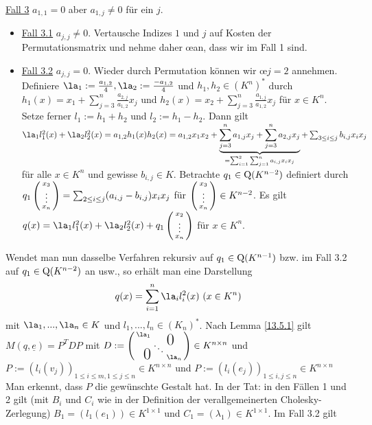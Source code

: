 \documentclass[../../main.tex]{subfiles}
\begin{document}
\begin{cproof}
\noindent\underline{Fall 3} $a_{1,1}=0$ aber $a_{1,j}\neq 0$ für ein $j$. 
\begin{itemize}
\item[ ]\underline{Fall 3.1} $a_{j,j}\neq 0$. Vertausche Indizes $1$ und $j$ auf Kosten der Permutationsmatrix und nehme daher \oe an, dass wir im Fall 1 sind.
\item[ ] \underline{Fall 3.2} $a_{j,j}=0$. Wieder durch Permutation können wir \oe $j=2$ annehmen. Definiere $\la_1:=\frac{a_{1,2}}{4}, \la_2:=\frac{-a_{1,2}}{4}$ und $h_1,h_2\in (K^n)^*$ durch $h_1(x)=x_1+\sum_{j=3}^n\frac{a_{2,j}}{a_{1,2}}x_j$ und $h_2(x)=x_2+\sum_{j=3}^n\frac{a_{1,j}}{a_{1,2}}x_j$ für $x\in K^n$. Setze ferner $l_1:=h_1+h_2$ und $l_2:=h_1-h_2$. Dann gilt $\la_1 l_1^2(x)+\la_2l_2^2(x)=a_{1,2}h_1(x)h_2(x)=a_{1,2}x_1x_2+\underbrace{\sum_{j=3}^n a_{1,j} x_j+\sum_{j=3}^n a_{2,j}x_j}_{=\sum_{i=1}^2\sum_{j=1}^n a_{i,j}x_ix_j}+\sum_{3\le i\le j}b_{i,j}x_ix_j$ für alle $x\in K^n$ und gewisse $b_{i,j}\in K$. Betrachte $q_1\in \operatorname{Q}(K^{n-2})$ definiert durch  $q_1\left(\begin{smallmatrix}x_3\\\vdots\\x_n\end{smallmatrix}\right)=\sum_{2\le i\le j} (a_{i,j}-b_{i,j})x_ix_j$ für $\left(\begin{smallmatrix}x_3\\\vdots\\x_n\end{smallmatrix}\right)\in K^{n-2}$. Es gilt $q(x)=\la_1l_1^2(x)+\la_2l_2^2(x)+q_1\cvec{x_2\\\vdots\\x_n}$ für $x\in K^n$.\\
\end{itemize}
Wendet man nun dasselbe Verfahren rekursiv auf $q_1\in \operatorname{Q}(K^{n-1})$ bzw. im Fall 3.2 auf $q_1\in \operatorname{Q}(K^{n-2})$ an usw., so erhält man eine Darstellung 
\begin{align*}
q(x)=\sum_{i=1}^n \la_il_i^2(x)\ (x\in K^n)
\end{align*}	 
mit $\la_1,...,\la_n\in K$ und $l_1,...,l_n\in (K_n)^*$. Nach Lemma \ref{13.5.1} gilt $M(q,\underline{e})=P^TDP$ mit $D:=\left(\begin{smallmatrix}
\la_1 & & \llap{$\overset{\blap{\LARGE 0}}{~}$} \\
& \ddots &\\
\rlap{\tlap{\LARGE 0}} & & \la_n\end{smallmatrix}\right)\in K^{n\times n}$ und $P:=(l_i(v_j))_{1\le i\le m, 1\le j\le n}\in K^{n\times n}$ und $P:=(l_i(e_j))_{1\le i,j\le n}\in K^{n\times n}$ Man erkennt, dass $P$ die gewünschte Gestalt hat. In der Tat: in den Fällen 1 und 2 gilt (mit $B_i$ und $C_i$ wie in der Definition der verallgemeinerten Cholesky-Zerlegung) $B_1=(l_1(e_1))\in K^{1\times 1}$ und $C_1=(\lambda_1)\in K^{1\times 1}$. Im Fall 3.2 gilt

\end{cproof}
\end{document}
